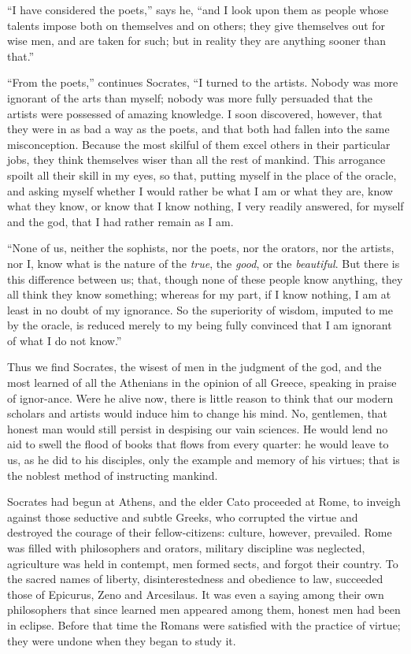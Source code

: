 ``I have considered the poets,'' says he, ``and I look upon them as
people whose talents impose both on themselves and on others; they
give themselves out for wise men, and are taken for such; but in
reality they are anything sooner than that.''

``From the poets,'' continues Socrates, ``I turned to the artists.
Nobody was more ignorant of the arts than myself; nobody was more
fully persuaded that the artists were possessed of amazing knowledge.
I soon discovered, however, that they were in as bad a way as the
poets, and that both had fallen into the same misconception. Because
the most skilful of them excel others in their particular jobs, they
think themselves wiser than all the rest of mankind. This arrogance
spoilt all their skill in my eyes, so that, putting myself in the
place of the oracle, and asking myself whether I would rather be what
I am or what they are, know what they know, or know that I know
nothing, I very readily answered, for myself and the god, that I had
rather remain as I am.

``None of us, neither the sophists, nor the poets, nor the orators,
nor the artists, nor I, know what is the nature of the \textit{true},
the \textit{good}, or the \textit{beautiful}. But there is this
difference between us; that, though none of these people know
anything, they all think they know something; whereas for my part, if
I know nothing, I am at least in no doubt of my ignorance. So the
superiority of wisdom, imputed to me by the oracle, is reduced merely
to my being fully convinced that I am ignorant of what I do not
know.''

Thus we find Socrates, the wisest of men in the judgment of the god,
and the most learned of all the Athenians in the opinion of all
Greece, speaking in praise of ignor-ance. Were he alive now,
there is little reason to think that our modern scholars and artists
would induce him to change his mind. No, gentlemen, that honest man
would still persist in despising our vain sciences. He would lend no
aid to swell the flood of books that flows from every quarter: he
would leave to us, as he did to his disciples, only the example and
memory of his virtues; that is the noblest method of instructing
mankind.

Socrates had begun at Athens, and the elder Cato proceeded at Rome, to
inveigh against those seductive and subtle Greeks, who corrupted the
virtue and destroyed the courage of their fellow-citizens: culture,
however, prevailed. Rome was filled with philosophers and orators,
military discipline was neglected, agriculture was held in contempt,
men formed sects, and forgot their country. To the sacred names of
liberty, disinterestedness and obedience to law, succeeded those of
Epicurus, Zeno and Arcesilaus. It was even a saying among their own
philosophers that since learned men appeared among them, honest men
had been in eclipse. Before that time the Romans were satisfied with
the practice of virtue; they were undone when they began to study it.

